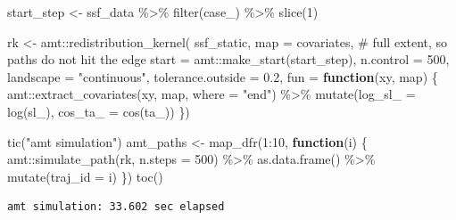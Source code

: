 \documentclass[
  letterpaper,
  DIV=11,
  numbers=noendperiod]{scrartcl}
\newenvironment{Shaded}{\begin{snugshade}}{\end{snugshade}}
\newcommand{\AttributeTok}[1]{\textcolor[rgb]{0.40,0.45,0.13}{#1}}
\newcommand{\CommentTok}[1]{\textcolor[rgb]{0.37,0.37,0.37}{#1}}
\newcommand{\ControlFlowTok}[1]{\textcolor[rgb]{0.00,0.23,0.31}{\textbf{#1}}}
\newcommand{\DecValTok}[1]{\textcolor[rgb]{0.68,0.00,0.00}{#1}}
\newcommand{\FloatTok}[1]{\textcolor[rgb]{0.68,0.00,0.00}{#1}}
\newcommand{\FunctionTok}[1]{\textcolor[rgb]{0.28,0.35,0.67}{#1}}
\newcommand{\NormalTok}[1]{\textcolor[rgb]{0.00,0.23,0.31}{#1}}
\newcommand{\OtherTok}[1]{\textcolor[rgb]{0.00,0.23,0.31}{#1}}
\newcommand{\SpecialCharTok}[1]{\textcolor[rgb]{0.37,0.37,0.37}{#1}}
\newcommand{\StringTok}[1]{\textcolor[rgb]{0.13,0.47,0.30}{#1}}
\begin{document}
\begin{Shaded}
\begin{Highlighting}[]
\NormalTok{start\_step }\OtherTok{\textless{}{-}}\NormalTok{ ssf\_data }\SpecialCharTok{\%\textgreater{}\%} \FunctionTok{filter}\NormalTok{(case\_) }\SpecialCharTok{\%\textgreater{}\%} \FunctionTok{slice}\NormalTok{(}\DecValTok{1}\NormalTok{)}

\NormalTok{rk }\OtherTok{\textless{}{-}}\NormalTok{ amt}\SpecialCharTok{::}\FunctionTok{redistribution\_kernel}\NormalTok{(}
\NormalTok{  ssf\_static,}
  \AttributeTok{map       =}\NormalTok{ covariates,                     }\CommentTok{\# full extent, so paths do not hit the edge}
  \AttributeTok{start     =}\NormalTok{ amt}\SpecialCharTok{::}\FunctionTok{make\_start}\NormalTok{(start\_step),}
  \AttributeTok{n.control =} \DecValTok{500}\NormalTok{,}
  \AttributeTok{landscape =} \StringTok{"continuous"}\NormalTok{,}
  \AttributeTok{tolerance.outside =} \FloatTok{0.2}\NormalTok{,}
  \AttributeTok{fun =} \ControlFlowTok{function}\NormalTok{(xy, map) \{}
\NormalTok{    amt}\SpecialCharTok{::}\FunctionTok{extract\_covariates}\NormalTok{(xy, map, }\AttributeTok{where =} \StringTok{"end"}\NormalTok{) }\SpecialCharTok{\%\textgreater{}\%}
      \FunctionTok{mutate}\NormalTok{(}\AttributeTok{log\_sl\_ =} \FunctionTok{log}\NormalTok{(sl\_), }\AttributeTok{cos\_ta\_ =} \FunctionTok{cos}\NormalTok{(ta\_))}
\NormalTok{  \})}

\FunctionTok{tic}\NormalTok{(}\StringTok{"amt simulation"}\NormalTok{)}
\NormalTok{amt\_paths }\OtherTok{\textless{}{-}} \FunctionTok{map\_dfr}\NormalTok{(}\DecValTok{1}\SpecialCharTok{:}\DecValTok{10}\NormalTok{, }\ControlFlowTok{function}\NormalTok{(i) \{}
\NormalTok{  amt}\SpecialCharTok{::}\FunctionTok{simulate\_path}\NormalTok{(rk, }\AttributeTok{n.steps =} \DecValTok{500}\NormalTok{) }\SpecialCharTok{\%\textgreater{}\%}
    \FunctionTok{as.data.frame}\NormalTok{() }\SpecialCharTok{\%\textgreater{}\%}
    \FunctionTok{mutate}\NormalTok{(}\AttributeTok{traj\_id =}\NormalTok{ i)}
\NormalTok{\})}
\FunctionTok{toc}\NormalTok{()}
\end{Highlighting}
\end{Shaded}

\begin{verbatim}
amt simulation: 33.602 sec elapsed
\end{verbatim}

\begin{Shaded}
\end{Shaded}
\end{document}
